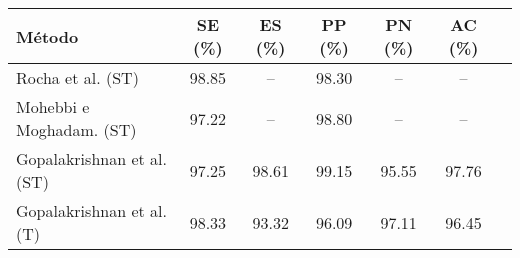 \begin{tabular}{lcccccc}
    \toprule
    Método & SE (\%) & ES (\%) & PP (\%) & PN (\%) & AC (\%)\\
    \midrule
    Rocha et al. (ST)          & \cellcolor[gray]{0.9}98.85 & --    & 98.30 & --    & --   \\
    Mohebbi e Moghadam. (ST)   & 97.22 & --    & 98.80 & --    & --   \\
    Gopalakrishnan et al. (ST) & 97.25 & 98.61 & \cellcolor[gray]{0.9}99.15 & 95.55 & 97.76\\
    Gopalakrishnan et al. (T)  & 98.33 & 93.32 & 96.09 & 97.11 & 96.45\\
    \bottomrule
\end{tabular}
